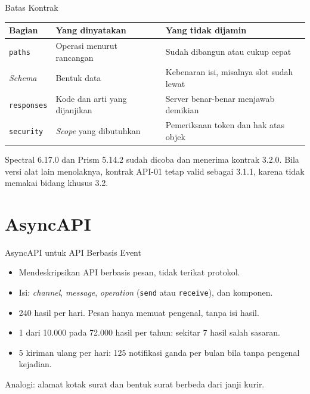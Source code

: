 \documentclass[aspectratio=169, table, 12pt]{beamer}
\begin{document}
\begin{frame}{{\Large Batas Kontrak}}
  \footnotesize
  \begin{tabularx}{\textwidth}{>{\raggedright\arraybackslash}p{2.4cm} >{\raggedright\arraybackslash}X >{\raggedright\arraybackslash}X}
    \hline
    \textbf{Bagian} & \textbf{Yang dinyatakan} & \textbf{Yang tidak dijamin} \\ \hline
    \texttt{paths} & Operasi menurut rancangan & Sudah dibangun atau cukup cepat \\ \hline
    \textit{Schema} & Bentuk data & Kebenaran isi, misalnya slot sudah lewat \\ \hline
    \texttt{responses} & Kode dan arti yang dijanjikan & Server benar-benar menjawab demikian \\ \hline
    \texttt{security} & \textit{Scope} yang dibutuhkan & Pemeriksaan token dan hak atas objek \\ \hline
  \end{tabularx}

  \vspace{8pt}
  \small Spectral 6.17.0 dan Prism 5.14.2 sudah dicoba dan menerima kontrak 3.2.0. Bila versi alat lain menolaknya, kontrak API-01 tetap valid sebagai 3.1.1, karena tidak memakai bidang khusus 3.2.
\end{frame}

\section{AsyncAPI}

\begin{frame}{{\Large AsyncAPI untuk API Berbasis Event}}
  \vspace{8pt}
  \begin{itemize}
    \item Mendeskripsikan API berbasis pesan, tidak terikat protokol.
    \item Isi: \textit{channel}, \textit{message}, \textit{operation} (\texttt{send} atau \texttt{receive}), dan komponen.
    \item 240 hasil per hari. Pesan hanya memuat pengenal, tanpa isi hasil.
    \item 1 dari 10.000 pada 72.000 hasil per tahun: sekitar 7 hasil salah sasaran.
    \item 5 kiriman ulang per hari: 125 notifikasi ganda per bulan bila tanpa pengenal kejadian.
  \end{itemize}
  \vspace{6pt}
  {\small Analogi: alamat kotak surat dan bentuk surat berbeda dari janji kurir.}
\end{frame}
\end{document}
